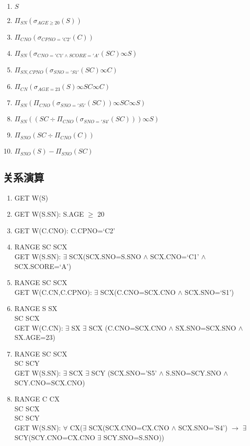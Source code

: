 \documentclass[11pt, a4paper, oneside]{article}
\begin{document}
\begin{enumerate}
\item $ S $
\item $ \Pi_{SN}{(\sigma_{AGE \geq 20}{(S)})} $
\item $ \Pi_{CNO}{(\sigma_{CPNO = 'C2'}{(C)})} $
\item $ \Pi_{SN}{(\sigma_{CNO = 'C1' \land SCORE = 'A'}{(SC)} \infty S)} $
\item $ \Pi_{SN,CPNO}{(\sigma_{SNO='S1'}{(SC)} \infty C)} $
\item $ \Pi_{CN}{(\sigma_{AGE = 23}{(S)} \infty SC \infty C)} $
\item $ \Pi_{SN}{(\Pi_{CNO}{(\sigma_{SNO = 'S5'}{(SC)})} \infty SC \infty S)} $
\item $ \Pi_{SN}{((SC \div \Pi_{CNO}{(\sigma_{SNO = 'S4'}{(SC)})}) \infty S)} $
\item $ \Pi_{SNO}{(SC \div \Pi_{CNO}{(C)})} $
\item $ \Pi_{SNO}{(S)} - \Pi_{SNO}{(SC)} $
\end{enumerate}

\subsection{关系演算}

\begin{enumerate}
	\item GET W(S)
	\item GET W(S.SN): S.AGE $\geq$ 20 
	\item GET W(C.CNO): C.CPNO=`C2'
	\item RANGE SC SCX \\
	GET W(S.SN): $\exists$ SCX(SCX.SNO=S.SNO $\wedge$ SCX.CNO=`C1' $\wedge$ SCX.SCORE=`A')
	\item RANGE SC SCX \\
	GET W(C.CN,C.CPNO): $\exists$ SCX(C.CNO=SCX.CNO $\wedge$ SCX.SNO=`S1')
	\item RANGE S SX \\
	\hspace*{1.4cm} SC SCX \\
	GET W(C.CN): $\exists$ SX $\exists$ SCX (C.CNO=SCX.CNO $\wedge$ SX.SNO=SCX.SNO
    $\wedge$ SX.AGE=23)
    
    \item RANGE SC SCX \\
    \hspace*{1.4cm} SC SCY \\
    GET W(S.SN): $\exists$ SCX $\exists$ SCY (SCX.SNO='S5' $\wedge$ S.SNO=SCY.SNO $\wedge$ SCY.CNO=SCX.CNO)
	
	\item RANGE C CX \\
	\hspace*{1.4cm} SC SCX \\
	\hspace*{1.4cm} SC SCY \\
	GET W(S.SN): $\forall$ CX($\exists$ SCX(SCX.CNO=CX.CNO $\wedge$ SCX.SNO='S4') $\rightarrow$ $\exists$ SCY(SCY.CNO=CX.CNO $\exists$ SCY.SNO=S.SNO))
	
	
\end{enumerate}
\end{document}
